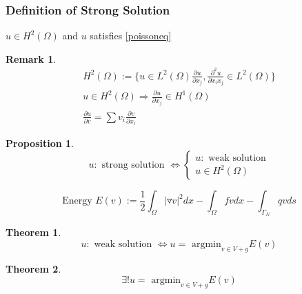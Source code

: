 \documentclass[a4paper,12pt]{article}
\newtheorem{remark}{Remark}[]
\newtheorem{prop}{Proposition}
\newtheorem{theorem}{Theorem}
\begin{document}
\subsubsection{Definition of Strong Solution}
$u \in H^2(\Omega)$ and $u$ satisfies \eqref{poissoneq}
\begin{remark}
	\begin{equation}\nonumber
	\begin{aligned}
	H^2(\Omega):= \{ u\in L^2(\Omega) \frac{\partial u}{\partial x_j},\frac{\partial^2 u}{\partial x_i x_j} \in L^2(\Omega)\}\\
	u \in H^2(\Omega) \Rightarrow \frac{\partial u}{\partial x_j} \in H^1(\Omega)\\
	\frac{\partial u}{\partial v} = \sum v_i \frac{\partial v}{\partial x_i}
	\end{aligned}
	\end{equation}
\end{remark}
\begin{prop}
	\begin{equation}\nonumber
	u: \text{ strong solution } \Leftrightarrow \begin{cases}
	u: \text{ weak solution}\\
	u \in H^2(\Omega)
	\end{cases}
	\end{equation}
\end{prop}
\begin{equation}\nonumber
\text{Energy } E(v) := \frac{1}{2} \int_\Omega |\triangledown v|^2 dx - \int_\Omega fv dx - \int_{\Gamma_N} qv ds
\end{equation}
\begin{theorem}\label{theorem1}
	\begin{equation}\nonumber
	u: \text{ weak solution } \Leftrightarrow u= \text{ argmin}_{v\in V+g} E(v)
	\end{equation}
\end{theorem}
\begin{theorem}\label{theorem2}
	\begin{equation}\nonumber
	\exists! u = \text{ argmin}_{v\in V+g} E(v)
	\end{equation}
\end{theorem}
\end{document}
